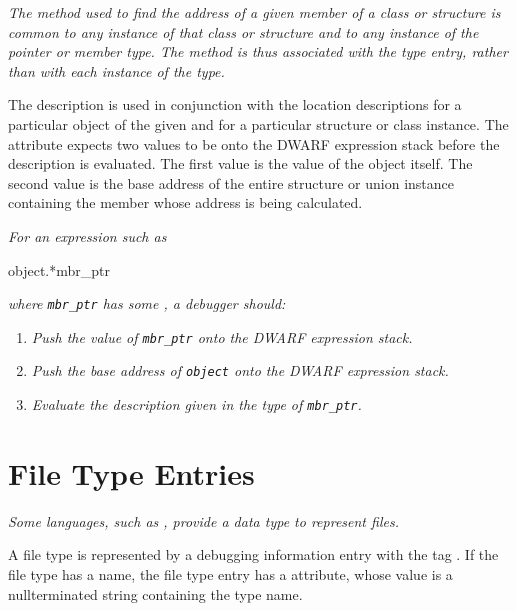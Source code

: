 {
\textit{The method used to find the address of a given member of a
class or structure is common to any instance of that class
or structure and to any instance of the pointer or member
type. The method is thus associated with the type entry,
rather than with each instance of the type.}

The \DWATuselocation{} description is used in conjunction
with the location descriptions for a particular object of the
given  and for a particular structure or
class instance. The \DWATuselocation{} 
attribute expects two values to be 
onto the DWARF expression stack before
the \DWATuselocation{} description is evaluated.
The first value 
is the value of the  object
itself. The second value 
is the base address of the
entire structure or union instance containing the member
whose address is being calculated.

\textit{For an expression such as}

\begin{nlnlisting}
    object.*mbr_ptr
\end{nlnlisting}
\textit{where \texttt{mbr\_ptr} has some , a debugger should:}
\begin{enumerate}[1. ]
\item \textit{Push the value of \texttt{mbr\_ptr} onto the DWARF expression stack.}
\item \textit{Push the base address of \texttt{object} onto the DWARF expression stack.}
\item \textit{Evaluate the \DWATuselocation{} description 
given in the type of \texttt{mbr\_ptr}.}
\end{enumerate}


\section{File Type Entries}
\label{chap:filetypeentries}

\textit{Some languages, such as , 
provide a data type to represent 
files.}

A file type is represented by a debugging information entry
with 
the tag
\DWTAGfiletypeTARG. 
If the file type has a name,
the file type entry has a \DWATname{} attribute,
whose value
is a null\dash terminated string containing the type name.

}
